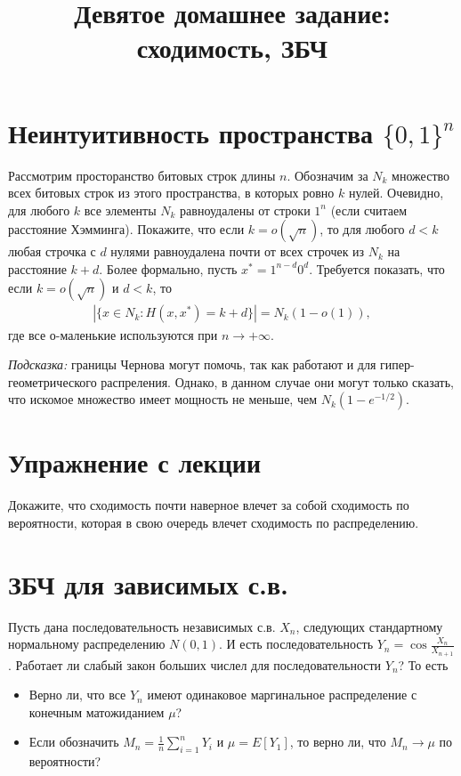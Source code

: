\documentclass[12pt]{article}
\title{Девятое домашнее задание: сходимость, ЗБЧ}
\begin{document}
\maketitle

\section{Неинтуитивность пространства $\{0, 1\}^n$}

Рассмотрим просторанство битовых строк длины $n$. Обозначим за $N_k$ множество всех битовых строк из этого пространства, в которых ровно $k$ нулей. Очевидно, для любого $k$ все элементы $N_k$ равноудалены от строки $1^n$ (если считаем расстояние Хэмминга). Покажите, что если $k = o(\sqrt{n})$, то для любого $d < k$ любая строчка с $d$ нулями равноудалена почти от всех строчек из $N_k$ на расстояние $k + d$. Более формально, пусть $x^* = 1^{n -d}0^d$. Требуется показать, что если $k = o(\sqrt{n})$ и $d < k$, то
\begin{align*}
    |\{x \in N_k: H(x, x^*) = k + d\}| = N_k(1 - o(1)),
\end{align*}
где все о-маленькие используются при $n \to +\infty$.

\emph{Подсказка:} границы Чернова могут помочь, так как работают и для гипер-геометрического распреления. Однако, в данном случае они могут только сказать, что искомое множество имеет мощность не меньше, чем $N_k(1 - e^{-1/2})$.

\section{Упражнение с лекции}

Докажите, что сходимость почти наверное влечет за собой сходимость по вероятности, которая в свою очередь влечет сходимость по распределению.

\section{ЗБЧ для зависимых с.в.}

Пусть дана последовательность независимых с.в. $X_n$, следующих стандартному нормальному распределению $N(0, 1)$. И есть последовательность $Y_n = \cos\frac{X_n}{X_{n + 1}}$. Работает ли слабый закон больших числел для последовательности $Y_n$? То есть 
\begin{itemize}
    \item Верно ли, что все $Y_n$ имеют одинаковое маргинальное распределение с конечным матожиданием $\mu$? 
    \item Если обозначить $M_n = \frac{1}{n}\sum_{i = 1}^{n} Y_i$ и $\mu = E[Y_1]$, то верно ли, что $M_n \to \mu$ по вероятности?
\end{itemize}
\end{document}
